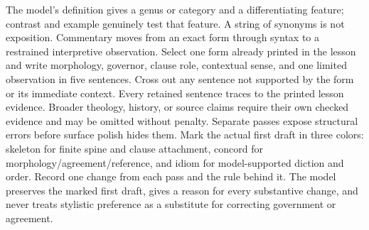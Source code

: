 {    {The model's definition gives a genus or category and a differentiating feature; contrast and example genuinely test that feature. A string of synonyms is not exposition.}
    {Commentary moves from an exact form through syntax to a restrained interpretive observation.}
    {Select one form already printed in the lesson and write morphology, governor, clause role, contextual sense, and one limited observation in five sentences.}
    {Cross out any sentence not supported by the form or its immediate context.}
    {Every retained sentence traces to the printed lesson evidence. Broader theology, history, or source claims require their own checked evidence and may be omitted without penalty.}
    {Separate passes expose structural errors before surface polish hides them.}
    {Mark the actual first draft in three colors: skeleton for finite spine and clause attachment, concord for morphology/agreement/reference, and idiom for model-supported diction and order.}
    {Record one change from each pass and the rule behind it.}
    {The model preserves the marked first draft, gives a reason for every substantive change, and never treats stylistic preference as a substitute for correcting government or agreement.}
}
